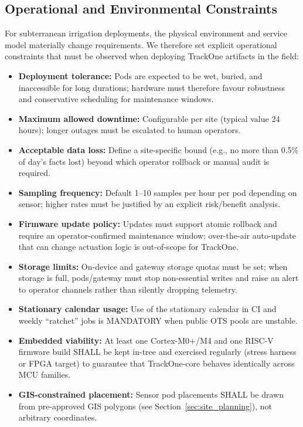 \subsection{Operational and Environmental Constraints}\label{subsec:operational-and-environmental-constraints}
For subterranean irrigation deployments, the physical environment and service model materially change requirements.
We therefore set explicit operational constraints that must be observed when deploying TrackOne artifacts in the field:
\begin{itemize}[nosep]
  \item \textbf{Deployment tolerance:} Pods are expected to be wet, buried, and inaccessible for long durations; hardware must therefore favour robustness and conservative scheduling for maintenance windows.
  \item \textbf{Maximum allowed downtime:} Configurable per site (typical value 24 hours); longer outages must be escalated to human operators.
  \item \textbf{Acceptable data loss:} Define a site-specific bound (e.g., no more than 0.5\% of day's facts lost) beyond which operator rollback or manual audit is required.
  \item \textbf{Sampling frequency:} Default 1--10 samples per hour per pod depending on sensor; higher rates must be justified by an explicit risk/benefit analysis.
  \item \textbf{Firmware update policy:} Updates must support atomic rollback and require an operator-confirmed maintenance window; over-the-air auto-update that can change actuation logic is out-of-scope for TrackOne.
  \item \textbf{Storage limits:} On-device and gateway storage quotas must be set; when storage is full, pods/gateway must stop non-essential writes and raise an alert to operator channels rather than silently dropping telemetry.
  \item \textbf{Stationary calendar usage:} Use of the stationary calendar in \ac{CI} and weekly ``ratchet'' jobs is MANDATORY when public \ac{OTS} pools are unstable.
  \item \textbf{Embedded viability:} At least one Cortex-M0+/M4 and one RISC-V firmware build \ac{SHA}LL be kept
  in-tree and exercised regularly (stress harness or FPGA target) to guarantee that TrackOne-core behaves identically
  across \ac{MCU} families.
  \item \textbf{GIS-constrained placement:} Sensor pod placements \ac{SHA}LL be drawn from pre-approved \ac{GIS} polygons (see Section~\ref{sec:site_planning}), not arbitrary coordinates.
\end{itemize}

